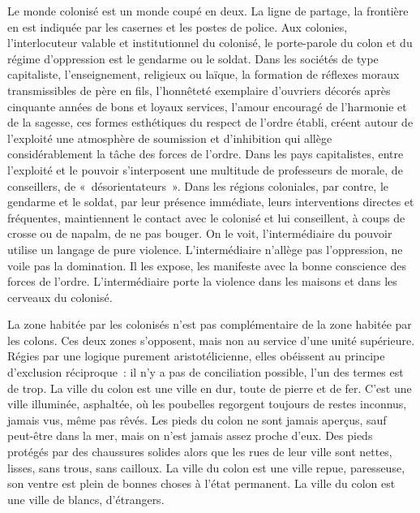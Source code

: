 \documentclass[french,twoside]{book} %
\begin{document}
Le monde colonisé est un monde coupé en deux. La ligne de partage, la frontière en est indiquée par les casernes et les postes de police. Aux colonies, l’interlocuteur valable et institutionnel du colonisé, le porte-parole du colon et du régime d’oppression est le gendarme ou le soldat. Dans les sociétés de type capitaliste, l’enseignement, religieux ou laïque, la formation de réflexes moraux transmissibles de père en fils, l’honnêteté exemplaire d’ouvriers décorés après cinquante années de bons et loyaux services, l’amour encouragé de l’harmonie et de la   sagesse, ces formes esthétiques du respect de l’ordre établi, créent autour de l’exploité une atmosphère de soumission et d’inhibition qui allège considérablement la tâche des forces de l’ordre. Dans les pays capitalistes, entre l’exploité et le pouvoir s’interposent une multitude de professeurs de morale, de conseillers, de « désorientateurs ». Dans les régions coloniales, par contre, le gendarme et le soldat, par leur présence immédiate, leurs interventions directes et fréquentes, maintiennent le contact avec le colonisé et lui conseillent, à coups de crosse ou de napalm, de ne pas bouger. On le voit, l’intermédiaire du pouvoir utilise un langage de pure violence. L’intermédiaire n’allège pas l’oppression, ne voile pas la domination. Il les expose, les manifeste avec la bonne conscience des forces de l’ordre. L’intermédiaire porte la violence dans les maisons et dans les cerveaux du colonisé.\par
\bigbreak
\noindent La zone habitée par les colonisés n’est pas complémentaire de la zone habitée par les colons. Ces deux zones s’opposent, mais non au service d’une unité supérieure. Régies par une logique purement aristotélicienne, elles obéissent au principe d’exclusion réciproque : il n’y a pas de conciliation possible, l’un des termes est de trop. La ville du colon est une ville en dur, toute de pierre et de fer. C’est une ville illuminée, asphaltée, où les poubelles regorgent toujours de restes inconnus, jamais vus, même pas rêvés. Les pieds du colon ne sont jamais aperçus, sauf peut-être dans la mer, mais on n’est jamais assez proche d’eux. Des pieds protégés par des chaussures solides alors que les rues de leur ville sont nettes, lisses, sans trous, sans cailloux. La ville du colon est une ville repue, paresseuse, son ventre est plein de bonnes choses à l’état permanent. La ville du colon est une ville de blancs, d’étrangers.\par
\end{document}
